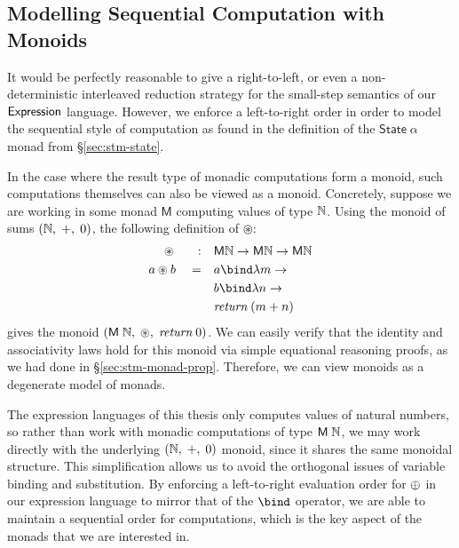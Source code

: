 
\subsection{Modelling Sequential Computation with Monoids}\label{sec:semantics-degenerate}%

It would be perfectly reasonable to give a right-to-left, or even
a non-deterministic interleaved reduction strategy for the small-step
semantics of our $\textsf{Expression}$ language. However, we enforce a left-to-right
order in order to model the sequential style of computation as found in the
definition of the $\mathsf{State}\;\alpha$ monad from \S\ref{sec:stm-state}.

In the case where the result type of monadic computations form a monoid,
such computations themselves can also be viewed as a monoid. Concretely,
suppose we are working in some monad $\mathsf{M}$ computing values of type
$\mathbb{N}$. Using the monoid of sums $(\mathbb{N},\;+,\;0)$, the following definition
of $\circledast$:
\begin{align*}
	\phantom{a} \circledast \phantom{b} \quad:\quad
		&\mathsf{M} \Nat \rightarrow \mathsf{M} \Nat \rightarrow \mathsf{M} \Nat \\
	a \circledast b \quad=\quad 
		&a \bind \lambda m \rightarrow \\
		&b \bind \lambda n \rightarrow \\
		&\textit{return}\;(m + n)
\end{align*}
gives the monoid $(\mathsf{M}\;\mathbb{N},\;\circledast,\;\textit{return}\;0)$. We can
easily verify that the identity and associativity laws hold for this monoid
via simple equational reasoning proofs, as we had done in
\S\ref{sec:stm-monad-prop}. Therefore, we can view monoids as a degenerate
model of monads.

The expression languages of this thesis only computes values of natural
numbers, so rather than work with monadic computations of type
$\mathsf{M}\;\mathbb{N}$, we may work directly with the underlying
$(\mathbb{N},\;{+},\;0)$ monoid, since it shares the same monoidal structure. This
simplification allows us to avoid the orthogonal issues of variable binding
and substitution. By enforcing a left-to-right evaluation order for $\oplus$
in our expression language to mirror that of the $\bind$ operator, we
are able to maintain a sequential order for computations, which is the key
aspect of the monads that we are interested in.


